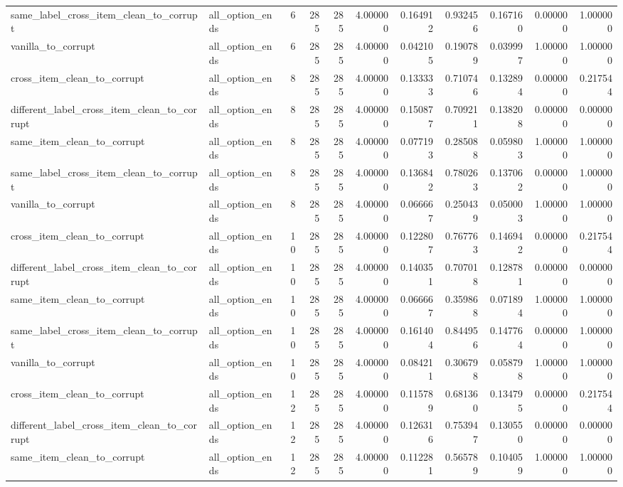 \begin{tabular}{llrrrrrrrrr}
same\_label\_cross\_item\_clean\_to\_corrupt & all\_option\_ends & 6 & 285 & 285 & 4.000000 & 0.164912 & 0.932456 & 0.167160 & 0.000000 & 1.000000 \\
vanilla\_to\_corrupt & all\_option\_ends & 6 & 285 & 285 & 4.000000 & 0.042105 & 0.190789 & 0.039997 & 1.000000 & 1.000000 \\
cross\_item\_clean\_to\_corrupt & all\_option\_ends & 8 & 285 & 285 & 4.000000 & 0.133333 & 0.710746 & 0.132894 & 0.000000 & 0.217544 \\
different\_label\_cross\_item\_clean\_to\_corrupt & all\_option\_ends & 8 & 285 & 285 & 4.000000 & 0.150877 & 0.709211 & 0.138208 & 0.000000 & 0.000000 \\
same\_item\_clean\_to\_corrupt & all\_option\_ends & 8 & 285 & 285 & 4.000000 & 0.077193 & 0.285088 & 0.059803 & 1.000000 & 1.000000 \\
same\_label\_cross\_item\_clean\_to\_corrupt & all\_option\_ends & 8 & 285 & 285 & 4.000000 & 0.136842 & 0.780263 & 0.137062 & 0.000000 & 1.000000 \\
vanilla\_to\_corrupt & all\_option\_ends & 8 & 285 & 285 & 4.000000 & 0.066667 & 0.250439 & 0.050003 & 1.000000 & 1.000000 \\
cross\_item\_clean\_to\_corrupt & all\_option\_ends & 10 & 285 & 285 & 4.000000 & 0.122807 & 0.767763 & 0.146942 & 0.000000 & 0.217544 \\
different\_label\_cross\_item\_clean\_to\_corrupt & all\_option\_ends & 10 & 285 & 285 & 4.000000 & 0.140351 & 0.707018 & 0.128781 & 0.000000 & 0.000000 \\
same\_item\_clean\_to\_corrupt & all\_option\_ends & 10 & 285 & 285 & 4.000000 & 0.066667 & 0.359868 & 0.071894 & 1.000000 & 1.000000 \\
same\_label\_cross\_item\_clean\_to\_corrupt & all\_option\_ends & 10 & 285 & 285 & 4.000000 & 0.161404 & 0.844956 & 0.147764 & 0.000000 & 1.000000 \\
vanilla\_to\_corrupt & all\_option\_ends & 10 & 285 & 285 & 4.000000 & 0.084211 & 0.306798 & 0.058798 & 1.000000 & 1.000000 \\
cross\_item\_clean\_to\_corrupt & all\_option\_ends & 12 & 285 & 285 & 4.000000 & 0.115789 & 0.681360 & 0.134795 & 0.000000 & 0.217544 \\
different\_label\_cross\_item\_clean\_to\_corrupt & all\_option\_ends & 12 & 285 & 285 & 4.000000 & 0.126316 & 0.753947 & 0.130550 & 0.000000 & 0.000000 \\
same\_item\_clean\_to\_corrupt & all\_option\_ends & 12 & 285 & 285 & 4.000000 & 0.112281 & 0.565789 & 0.104059 & 1.000000 & 1.000000 \\

\end{tabular}
